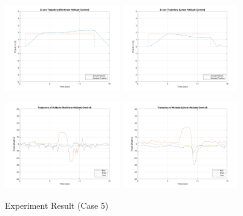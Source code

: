 \begin{figure}
    \includegraphics[width=0.45\textwidth]{graphics/experiment_plots/pitch_minus_non_position_z.png}
    \includegraphics[width=0.45\textwidth]{graphics/experiment_plots/pitch_minus_pid_position_z.png}

    \includegraphics[width=0.45\textwidth]{graphics/experiment_plots/pitch_minus_non_attitude.png}
    \includegraphics[width=0.45\textwidth]{graphics/experiment_plots/pitch_minus_pid_attitude.png}
    \caption{Experiment Result (Case 5)}
    \label{fig:exp_pitch_minus}
\end{figure}

